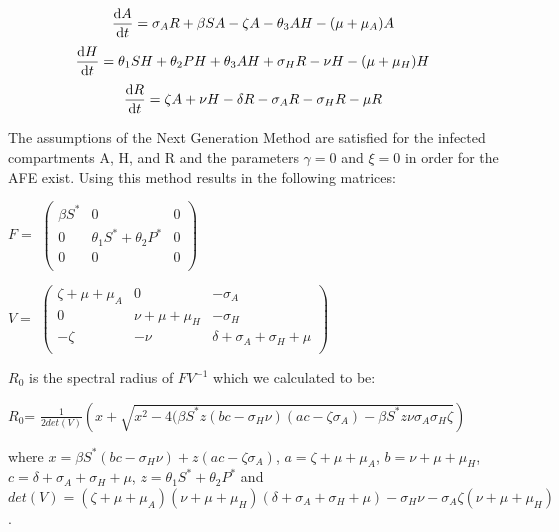 \documentclass[12pt]{article}
\begin{document}
\[\dv{A}{t} = \sigma_{A} R +\beta SA  -\zeta A - \theta_{3}AH-(\mu + \mu_{A})A   \quad\]
\[\dv{H}{t} = \theta_{1}SH+\theta_{2}PH+\theta_{3}AH + \sigma_{H}R-\nu H-(\mu+\mu_{H})H  \quad\]
\[\dv{R}{t} = \zeta A +\nu H -\delta R -\sigma_{A}R-\sigma_{H}R -\mu R\quad\]

The assumptions of the Next Generation Method are satisfied for the infected compartments A, H, and R and the parameters $\gamma=0$ and $\xi=0$ in order for the AFE exist. Using this method results in the following matrices:
\begin{center}
$F=$
$ \begin{pmatrix}

\beta S^* &  0  & 0 \\
0 & \theta_1 S^* +\theta_2 P^* & 0\\
0  &   0 & 0\\
\end{pmatrix}$



$V=$
$ \begin{pmatrix}

\zeta +\mu +\mu_A &  0  & -\sigma_A \\
0 &  \nu+\mu+\mu_H & -\sigma_H\\
-\zeta& -\nu  & \delta + \sigma_A + \sigma_H + \mu\\

\end{pmatrix}$
\end{center}

$R_0$ is the spectral radius of $FV^{-1}$ which we calculated to be:
\begin{center}
$R_0$= $\frac{1}{2det(V)}(x+\sqrt{x^2-4(\beta S^* z(bc-\sigma_H \nu)(ac-\zeta \sigma_A)-\beta S^* z \nu \sigma_A \sigma_H \zeta} )$
\end{center}
where $ x=\beta S^* (bc-\sigma_H \nu)+z(ac-\zeta\sigma_A)$, $a=\zeta +\mu + \mu_A$, $b=\nu + \mu + \mu_H$, $c=\delta + \sigma_A + \sigma_H +\mu$, $z=\theta_1 S^* + \theta_2 P^*$ and $det(V)=(\zeta + \mu +\mu_A)(\nu+\mu+\mu_H)(\delta+\sigma_A+\sigma_H+\mu)-\sigma_H\nu-\sigma_A\zeta(\nu+\mu+\mu_H)$.






 
\end{document}
